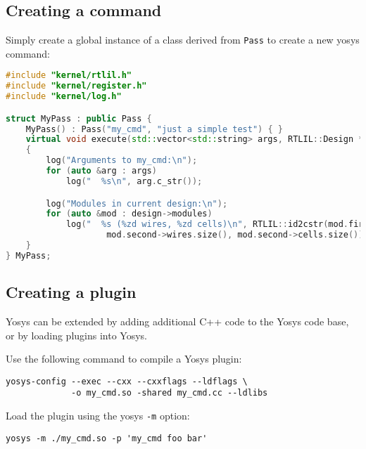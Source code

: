 
\subsection{Creating a command}

\begin{frame}[t, fragile]{\subsecname}
Simply create a global instance of a class derived from {\tt Pass} to create
a new yosys command:

\bigskip
\begin{lstlisting}[xleftmargin=1cm, basicstyle=\ttfamily\fontsize{8pt}{10pt}\selectfont, language=C++]
#include "kernel/rtlil.h"
#include "kernel/register.h"
#include "kernel/log.h"

struct MyPass : public Pass {
    MyPass() : Pass("my_cmd", "just a simple test") { }
    virtual void execute(std::vector<std::string> args, RTLIL::Design *design)
    {
        log("Arguments to my_cmd:\n");
        for (auto &arg : args)
            log("  %s\n", arg.c_str());

        log("Modules in current design:\n");
        for (auto &mod : design->modules)
            log("  %s (%zd wires, %zd cells)\n", RTLIL::id2cstr(mod.first),
                    mod.second->wires.size(), mod.second->cells.size());
    }
} MyPass;
\end{lstlisting}
\end{frame}


\subsection{Creating a plugin}

\begin{frame}[fragile]{\subsecname}
Yosys can be extended by adding additional C++ code to the Yosys code base, or
by loading plugins into Yosys.

\bigskip
Use the following command to compile a Yosys plugin:
\begin{lstlisting}[xleftmargin=1cm, basicstyle=\ttfamily\fontsize{8pt}{10pt}\selectfont]
yosys-config --exec --cxx --cxxflags --ldflags \
             -o my_cmd.so -shared my_cmd.cc --ldlibs
\end{lstlisting}

\bigskip
Load the plugin using the yosys {\tt -m} option:
\begin{lstlisting}[xleftmargin=1cm, basicstyle=\ttfamily\fontsize{8pt}{10pt}\selectfont]
yosys -m ./my_cmd.so -p 'my_cmd foo bar'
\end{lstlisting}
\end{frame}

